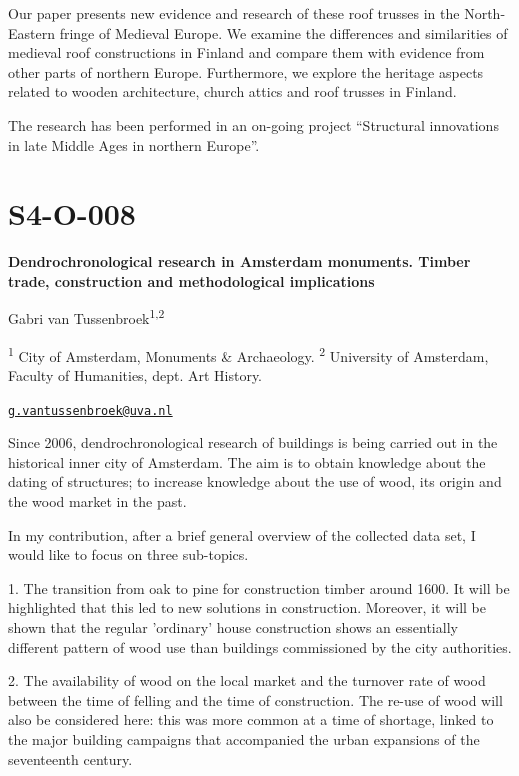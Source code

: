 \documentclass[
]{book}
\begin{document}
Our paper presents new evidence and research of these roof trusses in the North-Eastern fringe of Medieval Europe. We examine the differences and similarities of medieval roof constructions in Finland and compare them with evidence from other parts of northern Europe. Furthermore, we explore the heritage aspects related to wooden architecture, church attics and roof trusses in Finland.

The research has been performed in an on-going project ``Structural innovations in late Middle Ages in northern Europe''.

\hypertarget{s4-o-008}{%
\section*{S4-O-008}\label{s4-o-008}}

\textbf{Dendrochronological research in Amsterdam monuments. Timber trade, construction and methodological implications}

Gabri van Tussenbroek\textsuperscript{1,2}

\textsuperscript{1} City of Amsterdam, Monuments \& Archaeology. \textsuperscript{2} University of Amsterdam, Faculty of Humanities, dept. Art History.

\href{mailto:g.vantussenbroek@uva.nl}{\nolinkurl{g.vantussenbroek@uva.nl}}

Since 2006, dendrochronological research of buildings is being carried out in the historical inner city of Amsterdam. The aim is to obtain knowledge about the dating of structures; to increase knowledge about the use of wood, its origin and the wood market in the past.

In my contribution, after a brief general overview of the collected data set, I would like to focus on three sub-topics.

1. The transition from oak to pine for construction timber around 1600. It will be highlighted that this led to new solutions in construction. Moreover, it will be shown that the regular 'ordinary' house construction shows an essentially different pattern of wood use than buildings commissioned by the city authorities.

2. The availability of wood on the local market and the turnover rate of wood between the time of felling and the time of construction. The re-use of wood will also be considered here: this was more common at a time of shortage, linked to the major building campaigns that accompanied the urban expansions of the seventeenth century.
\end{document}
